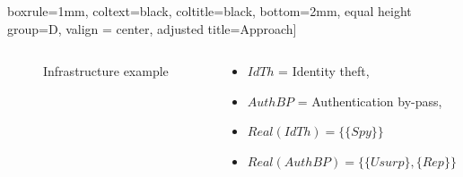 \documentclass{beamer}
\begin{document}
\begin{frame}[fragile]{}
\begin{tcolorbox}[adjusted title={\centering\large Attack models}]
\begin{columns}[T]
\begin{column}{.65\textwidth}
\begin{tcolorbox}
                boxrule=1mm,
                coltext=black, %
                coltitle=black, %
                bottom=2mm,
                equal height group=D,
                valign = center,
                adjusted title={\large Approach}]
                    \vspace{-1.25em}
                    \begin{columns}[c]
                        \begin{column}{.5\textwidth}
                            \begin{figure}[htb]
                                \centering
                                \resizebox{\textwidth}{!}{
                                    
                                }
                                \vspace{-1.8em}
                                \caption{Infrastructure example}
                                \label{fig:ex_archi}
                            \end{figure}
                        \end{column}
                        \begin{column}{.5\textwidth}
                            \begin{itemize}
                                \item $IdTh$ = Identity theft,
                                \item $AuthBP$ = Authentication by-pass,
                                \item $Real(IdTh) = \{ \{ Spy \} \}$
                                \item $Real(AuthBP) = \{ \{ Usurp \}, \{ Rep \} \}$
                            \end{itemize}
                        \end{column}
                    \end{columns}
                    \vspace{-.75em}
                    \begin{columns}[c]
                        \hspace{.1cm}
                        \begin{column}{.3\textwidth}
                            \begin{table}[htb]
                                \vspace{1.15em}
                                \centering
                                \begin{tabular}{|c|c|c|}

\end{tabular}
\end{table}
\end{column}
\end{columns}
\end{tcolorbox}
\end{column}
\end{columns}
\end{tcolorbox}
\end{frame}
\end{document}
